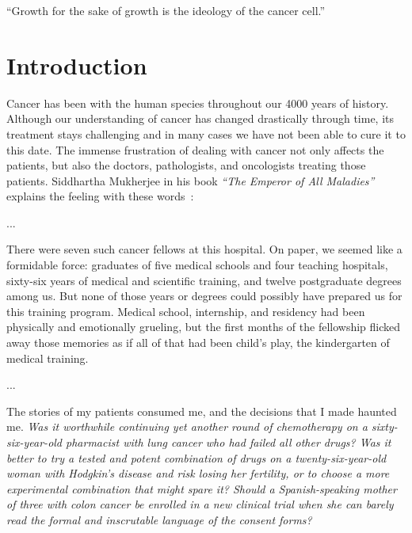 
\begin{savequote}[.5\linewidth]
  ``Growth for the sake of growth is the ideology of the cancer cell.''
\end{savequote}
\chapter{Introduction}
\label{ch:intro}
Cancer has been with the human species throughout our 4000 years of history.
Although our understanding of cancer has changed drastically through time, its
treatment stays challenging and in many cases we have not been able to cure it
to this date. The immense frustration of dealing with cancer not only affects
the patients, but also the doctors, pathologists, and oncologists treating
those patients. Siddhartha Mukherjee in his book \emph{``The Emperor of All
  Maladies''} explains the feeling with these
words~\cite[prologue]{the-emperor-of-all-maladies}:

\begin{displayquote}
  ...
  
  There were seven such cancer fellows at this hospital. On paper, we seemed
  like a formidable force: graduates of five medical schools and four teaching
  hospitals, sixty-six years of medical and scientific training, and twelve
  postgraduate degrees among us. But none of those years or degrees could
  possibly have prepared us for this training program. Medical school,
  internship, and residency had been physically and emotionally grueling, but
  the first months of the fellowship flicked away those memories as if all of
  that had been child's play, the kindergarten of medical training.

  ...

  The stories of my patients consumed me, and the decisions that I made haunted
  me. \emph{Was it worthwhile continuing yet another round of chemotherapy on a
    sixty-six-year-old pharmacist with lung cancer who had failed all other
    drugs? Was it better to try a tested and potent combination of drugs on a
    twenty-six-year-old woman with Hodgkin's disease and risk losing her
    fertility, or to choose a more experimental combination that might spare
    it? Should a Spanish-speaking mother of three with colon cancer be enrolled
    in a new clinical trial when she can barely read the formal and inscrutable
    language of the consent forms?}
\end{displayquote}

